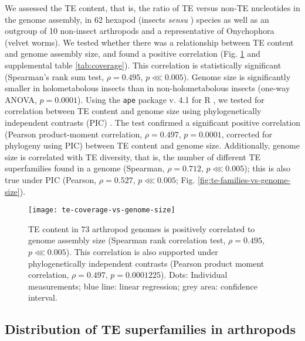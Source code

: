 We assessed the TE content, that is, the ratio of TE versus non-TE
nucleotides in the genome assembly, in 62 hexapod (insects \emph{sensu}
\citep{Misof2014}) species as well as an outgroup of 10 non-insect
arthropods and a representative of Onychophora (velvet worms). We tested
whether there was a relationship between TE content and genome assembly
size, and found a positive correlation (Fig.
\ref{fig:te-coverage-vs-genome-size} and supplemental table
\ref{tab:coverage}). This correlation is statistically significant
(Spearman's rank sum test, \(\rho = 0.495\), \(p \lll 0.005\)). Genome
size is significantly smaller in holometabolous insects than in
non-holometabolous insects (one-way ANOVA, \(p = 0.0001\)). Using the
\texttt{ape} package v. 4.1 \citep{Paradis2004} for R
\citep{RCoreTeam2017}, we tested for correlation between TE content and
genome size using phylogenetically independent contrasts (PIC)
\citep{Felsenstein1985}. The test confirmed a significant positive
correlation (Pearson product-moment correlation, \(\rho = 0.497\), \(p =
0.0001\), corrected for phylogeny using PIC) between TE content and
genome size. Additionally, genome size is correlated with TE diversity,
that is, the number of different TE superfamilies found in a genome
(Spearman, \(\rho = 0.712\), \(p \lll 0.005\)); this is also true under
PIC (Pearson, \(\rho = 0.527\), \(p \lll 0.005\); Fig.
\ref{fig:te-families-vs-genome-size}).

\begin{figure}[h!]
\begin{center}
\texttt{[image: te-coverage-vs-genome-size]}
\caption[TE content is positively correlated to genome size in
arthropods]{{TE content in 73 arthropod genomes is positively correlated
to genome assembly size (Spearman rank correlation test, \(\rho =
0.495\), \(p \lll 0.005\)). This correlation is also supported under
phylogenetically independent contrasts \protect\citep{Felsenstein1985}
(Pearson product moment correlation, \(\rho = 0.497\), \(p =
0.0001225\)). Dots: Individual measurements; blue line: linear
regression; grey area: confidence interval.%
\label{fig:te-coverage-vs-genome-size}
}}
\end{center}
\end{figure}

\subsection{Distribution of TE superfamilies in arthropods}

